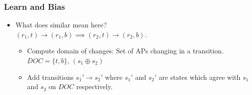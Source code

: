 \documentclass{if-beamer}
\begin{document}
\begin{frame}
	\frametitle{Learn and Bias}
	\begin{itemize}
		\item What does similar mean here?\\
		$(r_1, t) \rightarrow (r_1, b) \implies (r_2, t) \rightarrow (r_2,b)$. \\
		\begin{itemize}
			\item Compute domain of changes: Set of APs changing in a transition.\\
			$DOC = \{t,b\}$, $(s_1 \oplus s_2)$
			\item Add transitions $s_1' \rightarrow s_2'$ where $s_1'$ and $s_2'$ are states which agree with $s_1$ and $s_2$ on $DOC$ respectively.
		\end{itemize}
	\end{itemize}
\end{frame}
\end{document}
